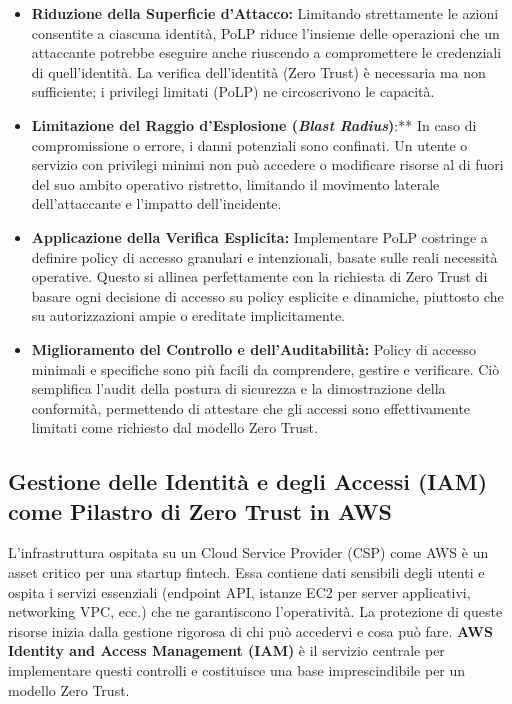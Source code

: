 \begin{itemize}
    \item \textbf{Riduzione della Superficie d'Attacco:} Limitando strettamente le azioni consentite a ciascuna identità, PoLP riduce l'insieme delle operazioni che un attaccante potrebbe eseguire anche riuscendo a compromettere le credenziali di quell'identità. La verifica dell'identità (Zero Trust) è necessaria ma non sufficiente; i privilegi limitati (PoLP) ne circoscrivono le capacità.
    \item \textbf{Limitazione del Raggio d'Esplosione (\textit{Blast Radius})}:** In caso di compromissione o errore, i danni potenziali sono confinati. Un utente o servizio con privilegi minimi non può accedere o modificare risorse al di fuori del suo ambito operativo ristretto, limitando il movimento laterale dell'attaccante e l'impatto dell'incidente.
    \item \textbf{Applicazione della Verifica Esplicita:} Implementare PoLP costringe a definire policy di accesso granulari e intenzionali, basate sulle reali necessità operative. Questo si allinea perfettamente con la richiesta di Zero Trust di basare ogni decisione di accesso su policy esplicite e dinamiche, piuttosto che su autorizzazioni ampie o ereditate implicitamente.
    \item \textbf{Miglioramento del Controllo e dell'Auditabilità:} Policy di accesso minimali e specifiche sono più facili da comprendere, gestire e verificare. Ciò semplifica l'audit della postura di sicurezza e la dimostrazione della conformità, permettendo di attestare che gli accessi sono effettivamente limitati come richiesto dal modello Zero Trust.
\end{itemize}
\subsection{Gestione delle Identità e degli Accessi (IAM) come Pilastro di Zero Trust in AWS}
\label{subsec:iam-zero-trust}

L'infrastruttura ospitata su un Cloud Service Provider (CSP) come AWS è un asset critico per una startup fintech. Essa contiene dati sensibili degli utenti e ospita i servizi essenziali (endpoint API, istanze EC2 per server applicativi, networking VPC, ecc.) che ne garantiscono l'operatività. La protezione di queste risorse inizia dalla gestione rigorosa di chi può accedervi e cosa può fare. \textbf{AWS Identity and Access Management (IAM)} è il servizio centrale per implementare questi controlli e costituisce una base imprescindibile per un modello Zero Trust.


